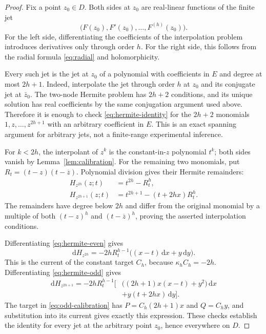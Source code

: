 \documentclass[11pt,a4paper]{article}
\numberwithin{equation}{section}
\theoremstyle{definition}
\theoremstyle{remark}
\newcommand{\dd}{\,\mathrm d}
\newcommand{\barz}{\overline z}
\begin{document}
\begin{proof}
Fix a point $z_0\in D$. Both sides at $z_0$ are real-linear functions of the
finite jet
\[
 \bigl(F(z_0),F'(z_0),\ldots,F^{(h)}(z_0)\bigr).
\]
For the left side, differentiating the coefficients of the interpolation
problem introduces derivatives only through order $h$. For the right side,
this follows from the radial formula \eqref{eq:radial} and holomorphicity.

Every such jet is the jet at $z_0$ of a polynomial with coefficients in $E$
and degree at most $2h+1$. Indeed, interpolate the jet through order $h$
at $z_0$ and its conjugate jet at $\bar z_0$. The two-node Hermite problem
has $2h+2$ conditions, and its unique solution has real coefficients by the
same conjugation argument used above. Therefore it is enough to check
\eqref{eq:hermite-identity} for the $2h+2$ monomials
$1,z,\ldots,z^{2h+1}$ with an arbitrary coefficient in $E$.
This is an exact spanning argument for arbitrary jets, not a finite-range
experimental inference.

For $k<2h$, the interpolant of $z^k$ is the constant-in-$z$ polynomial $t^k$;
both sides vanish by Lemma~\ref{lem:calibration}.
For the remaining two monomials, put $R_t=(t-z)(t-\barz)$. Polynomial division
gives their Hermite remainders:
\begin{align}
 H_{z^{2h}}(z;t)&=t^{2h}-R_t^h,\label{eq:hermite-even}\\
 H_{z^{2h+1}}(z;t)&=t^{2h+1}-(t+2hx)R_t^h.
 \label{eq:hermite-odd}
\end{align}
The remainders have degree below $2h$ and differ from the original monomial
by a multiple of both $(t-z)^h$ and $(t-\barz)^h$, proving the asserted
interpolation conditions.

Differentiating \eqref{eq:hermite-even} gives
\[
 \mathrm dH_{z^{2h}}=-2hR_t^{h-1}\bigl((x-t)\dd x+y\dd y\bigr).
\]
This is the current of the constant target $C_h$, because
$\kappa_hC_h=-2h$. Differentiating \eqref{eq:hermite-odd} gives
\begin{equation*}
\begin{split}
 \mathrm dH_{z^{2h+1}}=-2hR_t^{h-1}\bigl[
 &\bigl((2h+1)x(x-t)+y^2\bigr)\dd x\\
 &+y(t+2hx)\dd y\bigr].
\end{split}
\end{equation*}
The target in \eqref{eq:odd-calibration} has
$P=C_h(2h+1)x$ and $Q=C_hy$, and substitution into its current gives exactly
this expression. These checks establish the identity for every jet at the
arbitrary point $z_0$, hence everywhere on $D$.
\end{proof}
\end{document}
